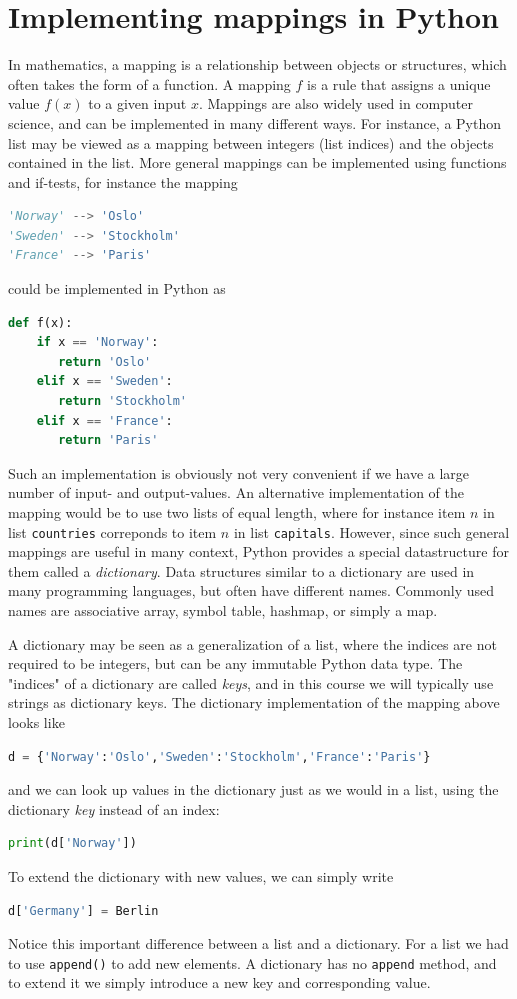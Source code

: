 \documentclass[graybox,envcountchap,sectrefs,final]{svmonodo}
\begin{document}
\section{Implementing mappings in Python}
In mathematics, a mapping is a relationship between objects or structures, which often takes the
form of a function. A mapping $f$ is a rule that assigns a unique value $f(x)$ to a given input $x$.
Mappings are also widely used in computer science, and can be implemented in many different ways.
For instance, a Python list may be viewed as a mapping between integers (list indices) and the objects
contained in the list. More general mappings can be implemented using functions and if-tests, for instance
the mapping
\begin{lstlisting}[language=Python,style=blue1]
'Norway' --> 'Oslo'
'Sweden' --> 'Stockholm'
'France' --> 'Paris'
\end{lstlisting}
could be implemented in Python as
\begin{lstlisting}[language=Python,style=blue1]
def f(x):
    if x == 'Norway':
       return 'Oslo'
    elif x == 'Sweden':
       return 'Stockholm'
    elif x == 'France':
       return 'Paris'
\end{lstlisting}
Such an implementation is obviously not very convenient if we have a large number of input- and output-values.
An alternative implementation of the mapping would be to use two lists of equal length,
where for instance item  $n$ in list
\texttt{countries} correponds to item $n$ in list \texttt{capitals}. However, since such general mappings are
useful in many context, Python provides a special datastructure for them called a \emph{dictionary}. Data
structures similar to a dictionary are used in many programming languages, but often have different names.
Commonly used names are associative array, symbol table, hashmap, or simply a map.

A dictionary may be seen as a generalization of a list, where the indices are not required to be integers,
but can be any immutable Python data type. The "indices" of a dictionary are called \emph{keys}, and in this course
we will typically use strings as dictionary keys.
The dictionary implementation of the mapping above looks like
\begin{lstlisting}[language=Python,style=blue1]
d = {'Norway':'Oslo','Sweden':'Stockholm','France':'Paris'}
\end{lstlisting}
and we can look up values in the dictionary just as we would in a list, using the dictionary \emph{key}
instead of an index:
\begin{lstlisting}[language=Python,style=blue1]
print(d['Norway'])
\end{lstlisting}
To extend the dictionary with new values, we can simply write
\begin{lstlisting}[language=Python,style=blue1]
d['Germany'] = Berlin
\end{lstlisting}
Notice this important difference between a list and a dictionary. For a list we had to use \texttt{append()} to
add new elements. A dictionary has no \texttt{append} method, and to extend it we simply introduce a new key
and corresponding value.
\end{document}
